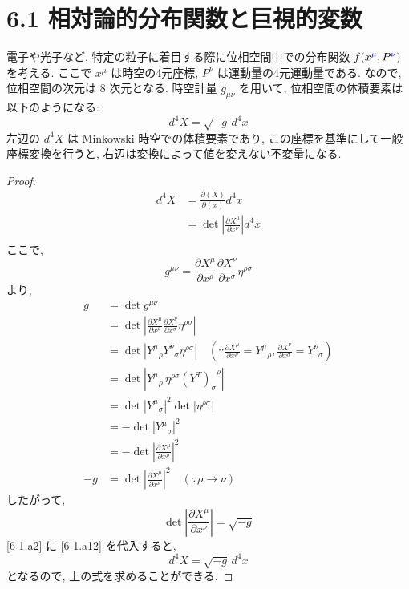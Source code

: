\documentclass[a4paper,12pt]{article}
\begin{document}
\newpage
\color{black}
\section*{6.1 相対論的分布関数と巨視的変数}
電子や光子など, 特定の粒子に着目する際に位相空間中での分布関数 $f(x^{\textcolor{blue}{\mu}},P^{\textcolor{blue}{\nu}})$ を考える. ここで $x^\mu$ は時空の4元座標, $P^\nu$ は運動量の4元運動量である. なので, 位相空間の次元は 8 次元となる. 時空計量 $g_{\mu\nu}$ を用いて, 位相空間の体積要素は以下のようになる:
\begin{equation*}
  d^4 X = \sqrt{-g}\, d^4 x
\end{equation*}
\color{blue}
左辺の $d^4 X$ は Minkowski 時空での体積要素であり, この座標を基準にして一般座標変換を行うと, 右辺は変換によって値を変えない不変量になる.
\begin{proof}
\begin{align*}
  d^4 X &= \frac{\partial (X)}{\partial (x)} d^4 x \tag{6-1.a1} \\
  &= \det \left| \frac{\partial X^\mu}{\partial x^\nu} \right| d^4 x \label{6-1.a2}\tag{6-1.a2} \\
\end{align*}
ここで,
\begin{equation*}
    g^{\mu\nu} = \frac{\partial X^\mu}{\partial x^\rho} \frac{\partial X^\nu}{\partial x^\sigma} \eta^{\rho\sigma} \tag{6-1.a3}
\end{equation*}
より,
\begin{align*}
    g &= \det g^{\mu\nu} \tag{6-1.a4} \\
    &= \det \left| \frac{\partial X^\mu}{\partial x^\rho} \frac{\partial X^\nu}{\partial x^\sigma} \eta^{\rho\sigma} \right| \tag{6-1.a5} \\
    &= \det \left| {Y^\mu}_{\rho} {Y^\nu}_{\sigma} \eta^{\rho\sigma} \right| \quad \left( \because \frac{\partial X^\mu}{\partial x^\rho} = {Y^\mu}_{\rho}, \frac{\partial X^\nu}{\partial x^\sigma} = {Y^\nu}_{\sigma} \right) \tag{6-1.a6} \\
    &= \det \left| {Y^\mu}_{\rho}\, \eta^{\rho\sigma} {(Y^{T})_\sigma}^{\rho}  \right| \tag{6-1.a7} \\
    &= \det \left| {Y^\mu}_{\sigma} \right|^2 \det |\eta^{\rho\sigma}| \tag{6-1.a8} \\
    &= - \det \left| {Y^\mu}_{\sigma} \right|^2 \tag{6-1.a9} \\
    &= - \det \left| \frac{\partial X^\mu}{\partial x^\rho} \right|^2 \tag{6-1.a10}\\
    -g &= \det \left| \frac{\partial X^\mu}{\partial x^\nu} \right|^2 \quad (\because \rho \to \nu) \tag{6-1.a11}
\end{align*}
したがって,
\begin{equation*}
    \det \left| \frac{\partial X^\mu}{\partial x^\nu} \right| = \sqrt{-g} \label{6-1.a12}\tag{6-1.a12}
\end{equation*}
\eqref{6-1.a2} に \eqref{6-1.a12} を代入すると,
\begin{equation*}
    d^4 X = \sqrt{-g}\, d^4 x \tag{6-1.a13}
\end{equation*}
となるので, 上の式を求めることができる.
\end{proof}
\end{document}

